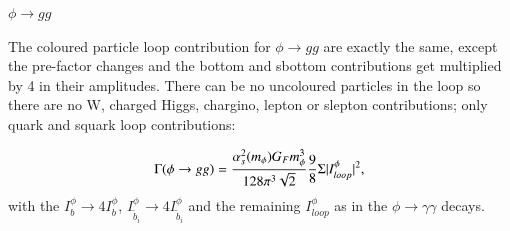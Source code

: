 \documentclass[final,3p,times]{elsarticle}
\begin{document}
\underline{$\phi \rightarrow gg$}

The coloured particle loop contribution for $\phi \rightarrow gg$ are exactly the same, except the pre-factor changes and the bottom and sbottom contributions get multiplied by 4 in their amplitudes. There can be no uncoloured particles in the loop so there are no W, charged Higgs, chargino, lepton or slepton contributions; only quark and squark loop contributions:

\begin{equation} \label{phigg}
\Gamma(\phi \rightarrow gg) = {\alpha_{s}^2(m_{\phi}) G_{F} m_{\phi}^3 \over 128 \pi^3 \sqrt{2}} {9 \over 8}\Sigma|I_{loop}^\phi|^2,
\end{equation}
with the $I_{b}^{\phi} \rightarrow 4 I_{b}^{\phi}$, $I_{\tilde{b}_i}^{\phi} \rightarrow 4 I_{\tilde{b}_i}^{\phi}$ and the remaining $I_{loop}^{\phi}$ as in the $\phi \rightarrow \gamma \gamma$ decays.
\end{document}
